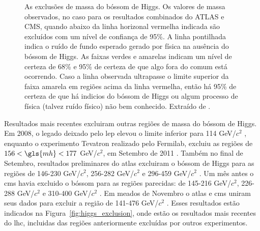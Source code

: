 \begin{figure}[t!]
\begin{center}
    \end{center}
\caption[Exclusões de massa do Higgs realizada pela combinação dos dados do
ATLAS e CMS. As exclusões de massa do Tevatron e LEP também estão indicadas.]{As exclusões de massa do bóssom de Higgs. Os valores de massa
observados, no caso para os resultados combinados do ATLAS e CMS, quando
abaixo da linha horizonal vermelha indicada são excluídos com um nível de
confiança de 95\%. A linha pontilhada indica o ruído de fundo esperado gerado
por física na ausência do bóssom de Higgs. As faixas verdes e amarelas indicam
um nível de certeza de 68\% e 95\% de certeza de que algo fora do comum está
ocorrendo. Caso a linha observada ultrapasse o limite superior da faixa amarela
em regiões acima da linha vermelha, então há 95\% de certeza de que há indicios
do bóssom de Higgs ou algum processo de física (talvez ruído físico) não bem
conhecido. Extraído de \cite{atlas_cms_higgs}.}
\end{figure}

Resultados mais recentes excluiram outras regiões de massa do bóssom de Higgs. Em 2008, 
o legado deixado pelo \gls{lep} elevou o limite inferior para 114 GeV/$c^2$
\cite{lep_higgs_2008}, enquanto o experimento Tevatron realizado pelo Fermilab, excluiu as
regiões de $156 < \gls{mh} < 177$ GeV/$c^2$, em Setembro de 2011
\cite{tevatron_higgs}. Também no final de Setembro, resultados preliminares do
\gls{atlas} excluiram o bóssom de Higgs para as regiões de 146-230 GeV/$c^2$, 256-282 GeV/$c^2$ 
e 296-459 GeV/$c^2$ \cite{atlas_higgs}. Um mês antes o \gls{cms} havia excluido o bóssom para
as regiões parecidas: de 145-216 GeV/$c^2$, 226-288 GeV/$c^2$ e 310-400 GeV/$c^2$
\cite{cms_higgs}. Em meados de Novembro o \gls{atlas} e \gls{cms} uniram seus
dados para excluir a região de 141-476 GeV/$c^2$ \cite{atlas_cms_higgs}. Esses
resultados estão indicados na Figura~\ref{fig:higgs_exclusion}, onde estão os
resultados mais recentes do \gls{lhc}, incluidas das regiões anteriormente
excluídas por outros experimentos.


